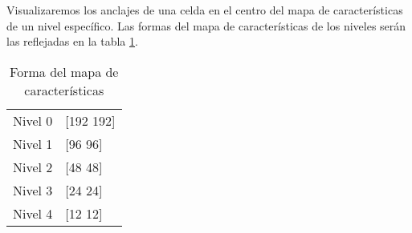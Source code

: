 Visualizaremos los anclajes de una celda en el centro del mapa de características de un nivel específico. Las formas del mapa de características de los niveles serán las reflejadas en la tabla \ref{formadelmapadecaracterísticas}.

\begin{table}[h]
	\begin{center}
		\begin{tabular}{l l}
			Nivel 0 & [192 192]\\
			Nivel 1 & [96 96]\\
			Nivel 2 & [48 48]\\
			Nivel 3 & [24 24]\\
			Nivel 4 & [12 12]\\
		\end{tabular}
		\caption{Forma del mapa de características}
		\label{formadelmapadecaracterísticas}
	\end{center}
\end{table}


